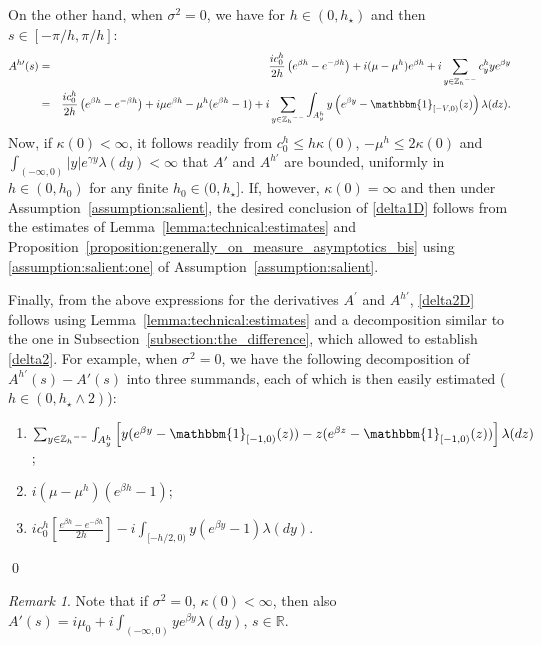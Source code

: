 \documentclass[pdftex,oneside,11pt,reqno]{amsart}
\theoremstyle{definition}
\theoremstyle{theorem}
\theoremstyle{remark}
\newtheorem{remark}{Remark}[section]
\numberwithin{equation}{section}
\numberwithin{definition}{section}
\begin{document}
On the other hand, when ${\sigma^2}=0$, we have for $h\in (0,h_\star)$ and then $s\in [-\pi/h,\pi/h]$:
\begin{eqnarray}\label{eq:FV:derivative_of_Ah}
A^{h\prime}(s)&=&\frac{ic_0^h}{2h}\left(e^{\beta h}-e^{-\beta h}\right)+i(\mu-\mu^h)e^{\beta h}+i\sum_{y\in {\mathbb{Z}_h}^{--}}c_y^hye^{\beta y}\\
&=&\frac{ic_0^h}{2h}\left(e^{\beta h}-e^{-\beta h}\right)+i\mu e^{\beta h}-\mu^h(e^{\beta h}-1)+i\sum_{y\in {\mathbb{Z}_h}^{--}}\int_{A_y^h}y\left(e^{\beta y}-{\mathbbm{1}_{[-V,0)}}(z)\right){\lambda}(dz).\nonumber
\end{eqnarray}
Now, if $\kappa(0)<\infty$, it follows readily from $c_0^h\leq h\kappa(0)$, $-{\mu}^h\leq 2\kappa(0)$ and $\int_{(-\infty,0)}\vert y\vert e^{\gamma y}{\lambda}(dy)<\infty$ that $A'$ and $A^{h\prime}$ are bounded, uniformly in $h\in (0,h_0)$ for any finite $h_0\in (0,h_\star]$. If, however, $\kappa(0)=\infty$ and then under Assumption~\ref{assumption:salient}, the desired conclusion of \ref{delta1D} follows from the estimates of Lemma~\ref{lemma:technical:estimates} and Proposition~\ref{proposition:generally_on_measure_asymptotics_bis} using \ref{assumption:salient:one} of Assumption~\ref{assumption:salient}. 

Finally, from the above expressions for the derivatives $A^\prime$ and $A^{h\prime}$, \ref{delta2D} follows using Lemma~\ref{lemma:technical:estimates} and a decomposition similar to the one in Subsection~\ref{subsection:the_difference}, which allowed to establish \ref{delta2}. For example, when ${\sigma^2}=0$, we have the following decomposition of $A^{h\prime}(s)-A'(s)$ into three summands, each of which is then easily estimated ($h\in (0,h_\star\land 2)$):
\begin{enumerate}[(1)]
\item $\sum_{y\in {\mathbb{Z}_h}^{--}}\int_{A_y^h}\left[y(e^{\beta y}-{\mathbbm{1}_{[-1,0)}}(z))-z(e^{\beta z}-{\mathbbm{1}_{[-1,0)}}(z))\right]{\lambda}(dz)$;
\item $i(\mu-\mu^h)(e^{\beta h}-1)$;
\item $ic_0^h\left[\frac{e^{\beta h}-e^{-\beta h}}{2h}\right]-i\int_{[-h/2,0)}y(e^{\beta y}-1){\lambda}(dy)$. 
\end{enumerate}
\qed

\begin{remark}\label{remark:A'forFV}
Note that if ${\sigma^2}=0$, $\kappa(0)<\infty$, then also $A'(s)=i{\mu}_0+i\int_{(-\infty,0)}ye^{\beta y}{\lambda}(dy)$, $s\in \mathbb{R}$.
\end{remark}
\end{document}
